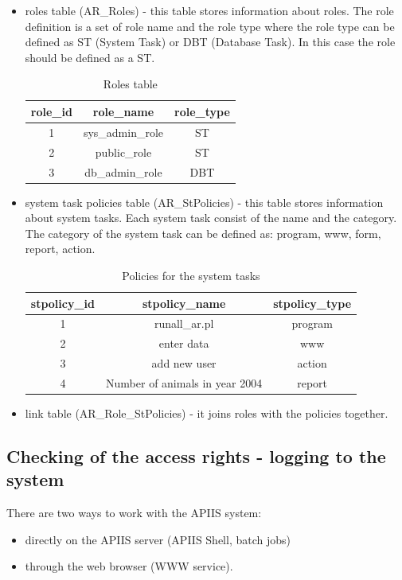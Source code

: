 \begin{itemize}
\item roles table (AR\_Roles) - this table stores information about roles. The role definition is a set of role name and the role type where the role type can be defined as ST (System Task) or DBT (Database Task). In this case the role should be defined as a ST.

\begin{table}[h]
\begin{center}\begin{tabular}{|c|c|c|}
\hline 
role\_id&role\_name&role\_type\tabularnewline
\hline 
1&sys\_admin\_role&ST\tabularnewline
\hline 
2&public\_role&ST\tabularnewline
\hline 
3&db\_admin\_role&DBT\tabularnewline
\hline 
\end{tabular}\end{center}
\caption{Roles table} \label{rolestable}
\end{table}

\newpage

\item system task policies table (AR\_StPolicies) - this table stores information about system tasks. Each system task consist of the name and the category. The category of the system task can be defined as: program, www, form, report, action. 

\begin{center}%
\begin{table}[h]
\begin{center}\begin{tabular}{|c|c|c|}
\hline 
stpolicy\_id&stpolicy\_name&stpolicy\_type\tabularnewline
\hline
\hline 
1&runall\_ar.pl&program\tabularnewline
\hline 
2&enter data&www\tabularnewline
\hline 
3&add new user&action
\tabularnewline
\hline 
4&Number of animals in year 2004&report
\tabularnewline
\hline
\end{tabular}\end{center}
\caption{Policies for the system tasks} \label {STpoliciestable}
\end{table}
\end{center}

\item link table (AR\_Role\_StPolicies) - it joins roles with the policies together. 
\end{itemize}

\subsection{Checking of the access rights - logging to the system \label{checkingARST}}
There are two ways to work with the APIIS system:
\begin{itemize}
\item directly on the APIIS server (APIIS Shell, batch jobs)
\item through the web browser (WWW service). 
\end{itemize}

